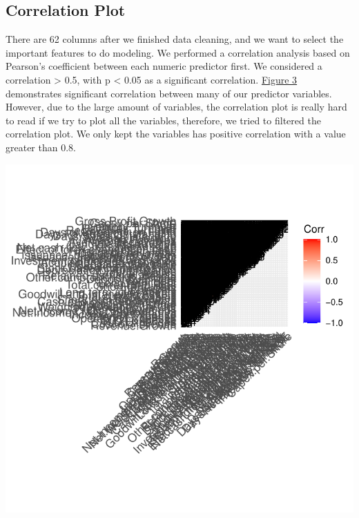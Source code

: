 \documentclass[11pt,]{article}
\begin{document}
\hypertarget{correlation-plot}{%
\subsection{Correlation Plot}\label{correlation-plot}}

There are 62 columns after we finished data cleaning, and we want to
select the important features to do modeling. We performed a correlation
analysis based on Pearson's coefficient between each numeric predictor
first. We considered a correlation \textgreater{} 0.5, with p
\textless{} 0.05 as a significant correlation.
\hyperref[sec:fig3]{Figure 3} demonstrates significant correlation
between many of our predictor variables. However, due to the large
amount of variables, the correlation plot is really hard to read if we
try to plot all the variables, therefore, we tried to filtered the
correlation plot. We only kept the variables has positive correlation
with a value greater than 0.8.

\begin{center}\includegraphics{stock_analysis_files/figure-latex/corrplot-1} \end{center}
\end{document}
